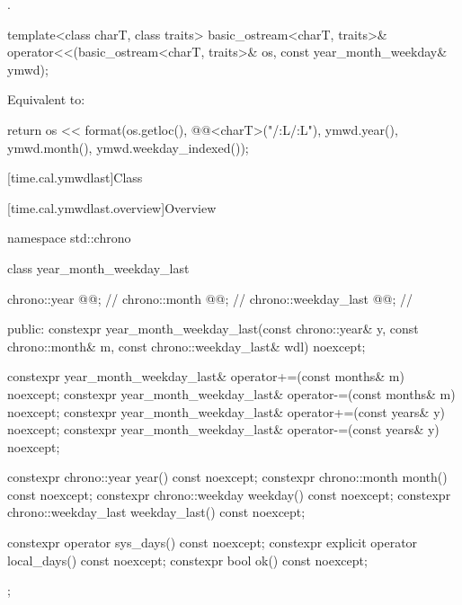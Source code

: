 \begin{itemdescr}
\pnum
\returns
{}.
\end{itemdescr}

%
\begin{itemdecl}
template<class charT, class traits>
  basic_ostream<charT, traits>&
    operator<<(basic_ostream<charT, traits>& os, const year_month_weekday& ymwd);
\end{itemdecl}

\begin{itemdescr}
\pnum
\effects
Equivalent to:
\begin{codeblock}
return os << format(os.getloc(), @@<charT>("{}/{:L}/{:L}"),
                    ymwd.year(), ymwd.month(), ymwd.weekday_indexed());
\end{codeblock}
\end{itemdescr}

[time.cal.ymwdlast]{Class }

[time.cal.ymwdlast.overview]{Overview}

\begin{codeblock}
namespace std::chrono {
  class year_month_weekday_last {
    chrono::year         @@;    // \expos
    chrono::month        @@;    // \expos
    chrono::weekday_last @@;  // \expos

  public:
    constexpr year_month_weekday_last(const chrono::year& y, const chrono::month& m,
                                      const chrono::weekday_last& wdl) noexcept;

    constexpr year_month_weekday_last& operator+=(const months& m) noexcept;
    constexpr year_month_weekday_last& operator-=(const months& m) noexcept;
    constexpr year_month_weekday_last& operator+=(const years& y)  noexcept;
    constexpr year_month_weekday_last& operator-=(const years& y)  noexcept;

    constexpr chrono::year         year()         const noexcept;
    constexpr chrono::month        month()        const noexcept;
    constexpr chrono::weekday      weekday()      const noexcept;
    constexpr chrono::weekday_last weekday_last() const noexcept;

    constexpr          operator sys_days()   const noexcept;
    constexpr explicit operator local_days() const noexcept;
    constexpr bool ok() const noexcept;
  };
}
\end{codeblock}

